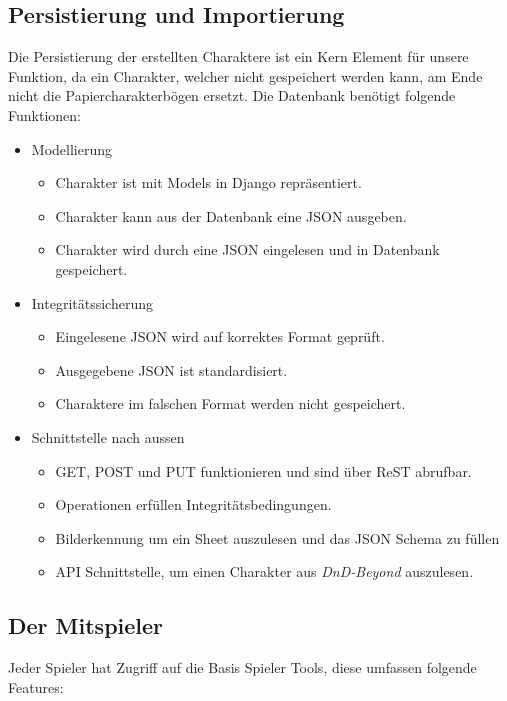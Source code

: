 \subsection{Persistierung und Importierung}\label{subsec:database_and_import}
Die Persistierung der erstellten Charaktere ist ein Kern Element für unsere Funktion, da ein Charakter, welcher nicht
gespeichert werden kann, am Ende nicht die Papiercharakterbögen ersetzt.
Die Datenbank benötigt folgende Funktionen:
\begin{itemize}
    \item Modellierung
    \begin{itemize}
        \item Charakter ist mit Models in Django repräsentiert.
        \item Charakter kann aus der Datenbank eine JSON ausgeben.
        \item Charakter wird durch eine JSON eingelesen und in Datenbank gespeichert.
    \end{itemize}
    \item Integritätssicherung
    \begin{itemize}
        \item Eingelesene JSON wird auf korrektes Format geprüft.
        \item Ausgegebene JSON ist standardisiert.
        \item Charaktere im falschen Format werden nicht gespeichert.
    \end{itemize}
    \item Schnittstelle nach aussen
    \begin{itemize}
        \item GET, POST und PUT funktionieren und sind über ReST abrufbar.
        \item Operationen erfüllen Integritätsbedingungen.
        \item Bilderkennung um ein Sheet auszulesen und das JSON Schema zu füllen
        \item API Schnittstelle, um einen Charakter aus \textit{DnD-Beyond} auszulesen.
    \end{itemize}
\end{itemize}


\subsection{Der Mitspieler}\label{subsec:the_player}

Jeder Spieler hat Zugriff auf die Basis Spieler Tools, diese umfassen folgende Features:

